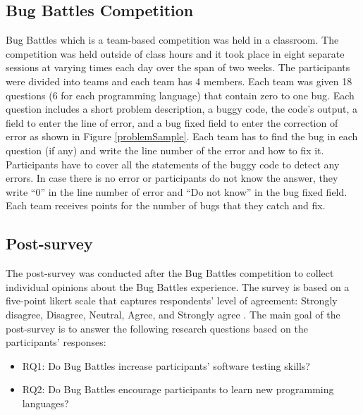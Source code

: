 \documentclass{article}
\begin{document}
\subsection{Bug Battles Competition}
Bug Battles which is a team-based competition was held in a classroom. The competition was held outside of class hours and it took place in eight separate sessions at varying times each day over the span of two weeks. The participants were divided into teams and each team has 4 members.
Each team was given 18 questions (6 for each programming language) that contain zero to one bug. Each question includes a short problem description, a buggy code, the code's output, a field to enter the line of error, and a bug fixed field to enter the correction of error as shown in Figure \ref{problemSample}. Each team has to find the bug in each question (if any) and write the line number of the error and how to fix it. Participants have to cover all the statements of the buggy code to detect any errors. In case there is no error or participants do not know the answer, they write ``0'' in the line number of error and ``Do not know'' in the bug fixed field. Each team receives points for the number of bugs that they catch and fix. 

\subsection{Post-survey}
The post-survey was conducted after the Bug Battles competition to collect individual opinions about the Bug Battles experience. The survey is based on a five-point likert scale that captures respondents' level of agreement: Strongly disagree, Disagree, Neutral, Agree, and Strongly agree \cite{weijters2021extremity}. The main goal of the post-survey is to answer the following research questions based on the participants' responses:
\begin{itemize}
   \item RQ1: Do Bug Battles increase participants' software testing skills?
   \item RQ2: Do Bug Battles encourage participants to learn new programming languages?
 \end{itemize}
\end{document}
